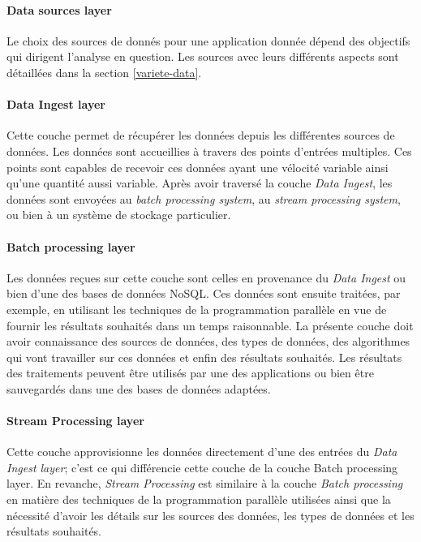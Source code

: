 			\paragraph{Data sources layer} Le choix des sources de donnés pour une application donnée dépend des objectifs qui dirigent l'analyse en question. Les sources avec leurs différents aspects sont détaillées dans la section \ref{variete-data}.
		\paragraph{Data Ingest layer} Cette couche permet de récupérer les données depuis les différentes sources de données. Les données sont accueillies à travers des points d'entrées multiples. Ces points  sont capables de recevoir  ces données ayant une vélocité variable ainsi qu'une quantité aussi variable.  Après avoir traversé  la couche \textit{Data Ingest}, les données sont envoyées au \textit{batch processing system}, au \textit{stream processing system}, ou bien à un système de stockage particulier.
		\paragraph{Batch processing layer} Les données reçues sur cette couche sont celles en provenance du \textit{Data Ingest} ou bien d'une des bases de données NoSQL. Ces données sont ensuite traitées, par exemple, en utilisant les techniques de la programmation parallèle en vue de fournir les résultats souhaités dans un temps raisonnable. La présente couche doit avoir connaissance des sources de données, des types de données, des algorithmes qui vont travailler sur ces données et enfin des résultats souhaités. Les résultats des traitements peuvent être utilisés par une des applications ou bien être sauvegardés dans une des bases de données adaptées.\par
		\paragraph{Stream Processing layer} Cette couche approvisionne les données directement d'une des entrées du \textit{Data Ingest layer}; c'est ce qui différencie cette couche de la couche Batch processing layer. En revanche, \textit{Stream Processing} est similaire à la couche   \textit{Batch processing} en matière  des techniques de la programmation parallèle utilisées ainsi que la nécessité d'avoir les détails sur les sources des données, les types de données et les résultats souhaités.\par
